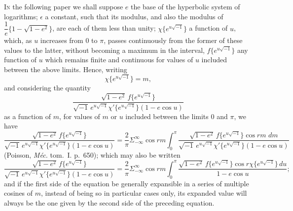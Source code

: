 \documentclass[11pt]{article}
\providecommand{\dd}{\,d}
\begin{document}
\noindent\textsc{In} the following paper we shall suppose $e$ the base of the hyperbolic system of
logarithms; $\epsilon$ a constant, such that its modulus, and also the modulus of
$\dfrac{1}{e}\{1-\sqrt{1-e^{2}}\}$, are each of them less than unity;
$\chi\{e^{u\sqrt{-1}}\}$ a function of $u$, which, as $u$ increases from $0$ to $\pi$,
passes continuously from the former of these values to the latter, without becoming a
maximum in the interval, $f\{e^{u\sqrt{-1}}\}$ any function of $u$ which remains finite
and continuous for values of $u$ included between the above limits. Hence, writing
\[
\chi\{e^{u\sqrt{-1}}\}=m \tag{1},
\]
and considering the quantity
\[
\frac{\sqrt{1-e^{2}}\,f\{e^{u\sqrt{-1}}\}}
{\sqrt{-1}\,e^{u\sqrt{-1}}\chi'\{e^{u\sqrt{-1}}\}(1-e\cos u)} \tag{2}
\]
as a function of $m$, for values of $m$ or $u$ included between the limits $0$ and $\pi$,
we have
\[
\frac{\sqrt{1-e^{2}}\,f\{e^{u\sqrt{-1}}\}}
{\sqrt{-1}\,e^{u\sqrt{-1}}\chi'\{e^{u\sqrt{-1}}\}(1-e\cos u)}
=\frac{2}{\pi}\Sigma_{-\infty}^{\infty}\cos rm
\int_{0}^{\pi}
\frac{\sqrt{1-e^{2}}\,f\{e^{u\sqrt{-1}}\}\cos rm\,\dd m}
{\sqrt{-1}\,e^{u\sqrt{-1}}\chi'\{e^{u\sqrt{-1}}\}(1-e\cos u)}
\tag{3}
\]
(Poisson, \textit{M\'ec.} tom.~I. p.~650); which may also be written
\[
\frac{\sqrt{1-e^{2}}\,f\{e^{u\sqrt{-1}}\}}
{\sqrt{-1}\,e^{u\sqrt{-1}}\chi'\{e^{u\sqrt{-1}}\}(1-e\cos u)}
=\frac{2}{\pi}\Sigma_{-\infty}^{\infty}\cos rm
\int_{0}^{\pi}
\frac{\sqrt{1-e^{2}}\,f\{e^{u\sqrt{-1}}\}\cos r\chi\{e^{u\sqrt{-1}}\}\dd u}
{1-e\cos u} \tag{4};
\]
and if the first side of the equation be generally expansible in a series of multiple
cosines of $m$, instead of being so in particular cases only, its expanded value will
always be the one given by the second side of the preceding equation.

\clearpage
\end{document}
